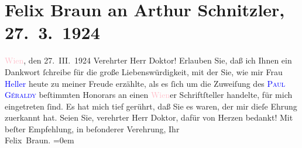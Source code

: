 

               \section[Felix Braun an Arthur Schnitzler, 27. 3. 1924]{ Felix Braun an Arthur Schnitzler, 27. 3. 1924}\nopagebreak{}\rehead{ }\normalsize\beginnumbering{} \toendnotes[C]{\smallbreak\pagebreak[2]} 
\pstart
           \centering{}{\pb}\textcolor{pink}{Wien}{}\ledrightnote{\textcolor{pink}{Wien}}, den 27. III. 1924\pend
           \pstart{}Verehrter Herr Doktor!\pend\pstart
           Erlauben Sie, daß ich Ihnen ein Dankwort ſchreibe für die große
                    Liebenswürdigkeit, mit der Sie, wie mir Frau \textcolor{blue}{Heller}{}\ledrightnote{\textcolor{blue}{Hedwig Heller}} heute zu meiner Freude erzählte, als es ſich um die Zuweiſung
                    des \textcolor{blue}{\textsc{Paul Géraldy}}{}\ledrightnote{\textcolor{blue}{Paul Géraldy}} beſtimmten Honorars an einen \textcolor{pink}{Wien}{}\ledrightnote{\textcolor{pink}{Wien}}er
                    Schriftſteller handelte, für mich eingetreten ſind. Es hat mich tief gerührt,
                    daß Sie es waren, der mir dieſe Ehrung zuerkannt hat. Seien Sie, verehrter Herr
                    Doktor, dafür von Herzen bedankt!\pend
           \pstart
           Mit beſter Empfehlung, in beſonderer Verehrung, Ihr{\\[\baselineskip]}\spacefill\mbox{Felix Braun.}\pend
           \leftskip=0em{}\endnumbering{}  
      